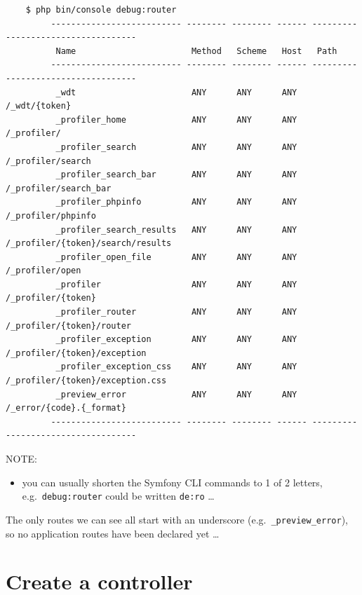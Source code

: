 \documentclass[a4paperpaper,openright]{book}
\providecommand{\tightlist}{%
  \setlength{\itemsep}{0pt}\setlength{\parskip}{0pt}}
\begin{document}
\begin{verbatim}
    $ php bin/console debug:router
         -------------------------- -------- -------- ------ ----------------------------------- 
          Name                       Method   Scheme   Host   Path                               
         -------------------------- -------- -------- ------ ----------------------------------- 
          _wdt                       ANY      ANY      ANY    /_wdt/{token}                      
          _profiler_home             ANY      ANY      ANY    /_profiler/                        
          _profiler_search           ANY      ANY      ANY    /_profiler/search                  
          _profiler_search_bar       ANY      ANY      ANY    /_profiler/search_bar              
          _profiler_phpinfo          ANY      ANY      ANY    /_profiler/phpinfo                 
          _profiler_search_results   ANY      ANY      ANY    /_profiler/{token}/search/results  
          _profiler_open_file        ANY      ANY      ANY    /_profiler/open                    
          _profiler                  ANY      ANY      ANY    /_profiler/{token}                 
          _profiler_router           ANY      ANY      ANY    /_profiler/{token}/router          
          _profiler_exception        ANY      ANY      ANY    /_profiler/{token}/exception       
          _profiler_exception_css    ANY      ANY      ANY    /_profiler/{token}/exception.css   
          _preview_error             ANY      ANY      ANY    /_error/{code}.{_format}           
         -------------------------- -------- -------- ------ ----------------------------------- 

\end{verbatim}

NOTE:

\begin{itemize}
\tightlist
\item
  you can usually shorten the Symfony CLI commands to 1 of 2 letters,
  e.g.~\texttt{debug:router} could be written \texttt{de:ro} \ldots{}
\end{itemize}

The only routes we can see all start with an underscore
(e.g.~\texttt{\_preview\_error}), so no application routes have been
declared yet \ldots{}

\hypertarget{create-a-controller}{%
\section{Create a controller}\label{create-a-controller}}
\end{document}
